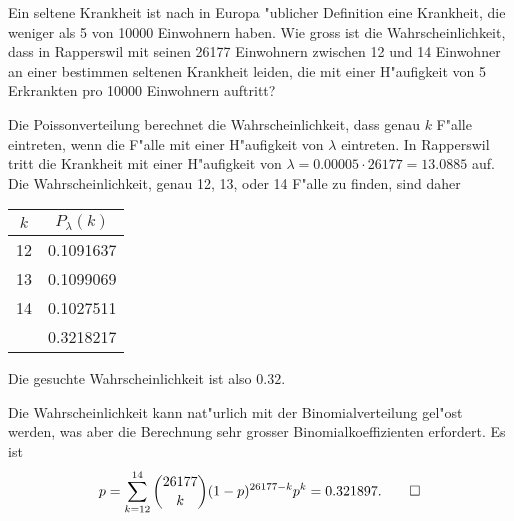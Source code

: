Ein seltene Krankheit ist nach in Europa "ublicher Definition eine
Krankheit, die weniger als 5 von 10000 Einwohnern haben. Wie gross
ist die Wahrscheinlichkeit, dass in Rapperswil mit seinen 26177
Einwohnern zwischen 12 und 14 Einwohner an einer bestimmen
seltenen Krankheit leiden, die mit einer H"aufigkeit von 5 Erkrankten
pro 10000 Einwohnern auftritt?

\begin{loesung}
Die Poissonverteilung berechnet die Wahrscheinlichkeit, dass genau
$k$ F"alle eintreten, wenn die F"alle mit einer H"aufigkeit
von $\lambda$ eintreten. In Rapperswil tritt die Krankheit mit
einer H"aufigkeit von $\lambda=0.00005 \cdot 26177=13.0885$ auf.
Die Wahrscheinlichkeit, genau 12, 13, oder 14 F"alle zu finden, sind
daher
\begin{center}
\begin{tabular}{|c|c|}
\hline
$k$&$P_\lambda(k)$\\
\hline
12&0.1091637\\
13&0.1099069\\
14&0.1027511\\
\hline
  &0.3218217\\
\hline
\end{tabular}
\end{center}
Die gesuchte Wahrscheinlichkeit ist also $0.32$.

Die Wahrscheinlichkeit kann nat"urlich mit der Binomialverteilung
gel"ost werden, was aber die Berechnung sehr grosser Binomialkoeffizienten
erfordert. Es ist
\[
p=\sum_{k=12}^{14}\binom{26177}{k}(1-p)^{26177-k}p^k=0.321897.
\qedhere
\]
\end{loesung}

